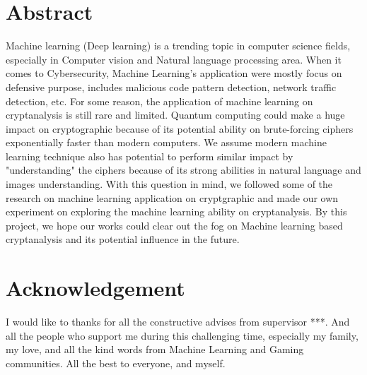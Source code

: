 \chapter*{\Large \center Abstract}

Machine learning (Deep learning) is a trending topic in computer science fields, especially in Computer vision and Natural language processing area. When it comes to Cybersecurity, Machine Learning's application were mostly focus on defensive purpose, includes malicious code pattern detection, network traffic detection, etc. For some reason, the application of machine learning on cryptanalysis is still rare and limited. Quantum computing could make a huge impact on cryptographic because of its potential ability on brute-forcing ciphers exponentially faster than modern computers. We assume modern machine learning technique also has potential to perform similar impact by "understanding" the ciphers because of its strong abilities in natural language and images understanding. With this question in mind, we followed some of the research on machine learning application on cryptgraphic and made our own experiment on exploring the machine learning ability on cryptanalysis. By this project, we hope our works could clear out the fog on Machine learning based cryptanalysis and its potential influence in the future. 

\chapter*{\Large \center Acknowledgement}

I would like to thanks for all the constructive advises from supervisor ***. And all the people who support me during this challenging time, especially my family, my love, and all the kind words from Machine Learning and Gaming communities. All the best to everyone, and myself.

